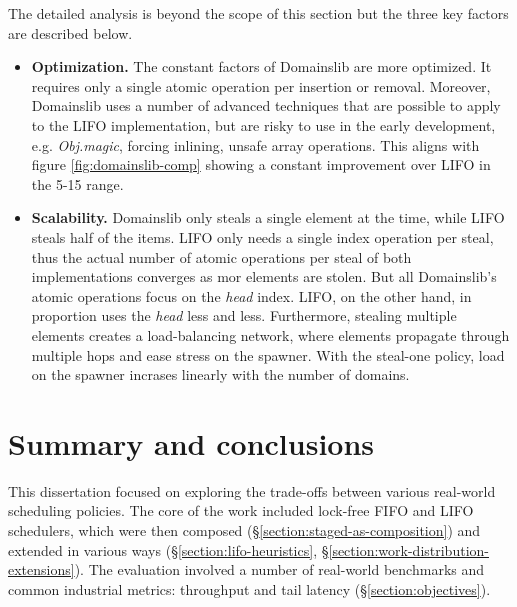 \documentclass[12pt,a4paper,twoside]{report}
\begin{document}
The detailed analysis is beyond the scope of this section but the three key factors are described below.
\begin{itemize}
    \item \textbf{Optimization.} The constant factors of Domainslib are more optimized. It requires only a single atomic operation per insertion or removal. Moreover, Domainslib uses a number of advanced techniques that are possible to apply to the LIFO implementation, but are risky to use in the early development, e.g. \textit{Obj.magic}, forcing inlining, unsafe array operations. This aligns with figure \ref{fig:domainslib-comp} showing a constant improvement over LIFO in the 5-15 range. 
    \item \textbf{Scalability.} Domainslib only steals a single element at the time, while LIFO steals half of the items. LIFO only needs a single index operation per steal, thus the actual number of atomic operations per steal of both implementations converges as mor elements are stolen. But all Domainslib's atomic operations focus on the \textit{head} index. LIFO, on the other hand, in proportion uses the \textit{head} less and less. Furthermore, stealing multiple elements creates a load-balancing network, where elements propagate through multiple hops and ease stress on the spawner. With the steal-one policy, load on the spawner incrases linearly with the number of domains.
\end{itemize} 

\chapter{Summary and conclusions}
\label{section:summary_and_conclusion}

This dissertation focused on exploring the trade-offs between various real-world scheduling policies. The core of the work included lock-free FIFO and LIFO schedulers, which were then composed (\S\ref{section:staged-as-composition}) and extended in various ways (\S\ref{section:lifo-heuristics}, \S\ref{section:work-distribution-extensions}). The evaluation involved a number of real-world benchmarks and common industrial metrics: throughput and tail latency (\S\ref{section:objectives}). 
\end{document}
